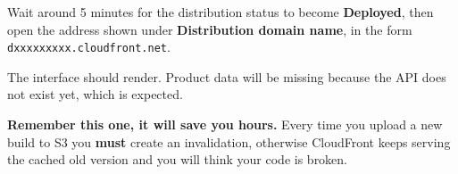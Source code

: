 Wait around 5 minutes for the distribution status to become
\textbf{Deployed}, then open the address shown under
\textbf{Distribution domain name}, in the form
\texttt{dxxxxxxxxx.cloudfront.net}.

The interface should render. Product data will be missing because the
API does not exist yet, which is expected.

\textbf{Remember this one, it will save you hours.} Every time you
upload a new build to S3 you \textbf{must} create an invalidation,
otherwise CloudFront keeps serving the cached old version and you will
think your code is broken.

\begin{Shaded}
\begin{Highlighting}[]
 \OperatorTok{\textless{}}\OperatorTok{\textgreater{}}
\end{Highlighting}
\end{Shaded}
